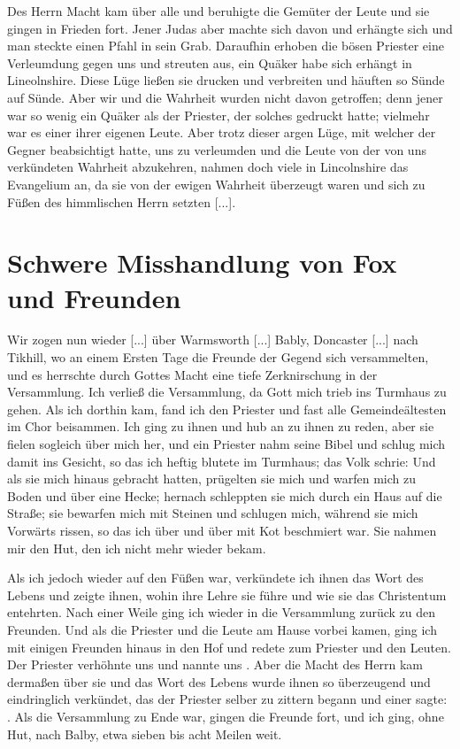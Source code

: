 Des Herrn Macht kam über alle und beruhigte die Gemüter der
Leute und sie gingen in Frieden fort. Jener Judas aber machte
sich davon und erhängte sich und man steckte einen Pfahl in sein
Grab. Daraufhin erhoben die bösen 
Priester eine Verleumdung
gegen uns und streuten aus, ein Quäker habe sich erhängt in
Lineolnshire. Diese Lüge ließen sie drucken und verbreiten und
häuften so Sünde auf Sünde. Aber wir und die Wahrheit wurden
nicht davon getroffen; denn jener war so wenig ein Quäker als
der Priester, der solches gedruckt hatte; vielmehr war es einer
ihrer eigenen Leute. Aber trotz dieser argen Lüge, mit welcher der
Gegner beabsichtigt hatte, uns zu verleumden und die Leute von
der von uns verkündeten Wahrheit abzukehren, nahmen doch viele
in Lincolnshire das Evangelium an, da sie von der ewigen 
Wahrheit überzeugt waren und sich zu Füßen des himmlischen Herrn
setzten [...].

\section{Schwere Misshandlung von Fox und Freunden}

Wir zogen nun wieder [...] über Warmsworth [...] Bably,
Doncaster [...] nach Tikhill, wo an einem Ersten Tage die
Freunde der Gegend sich versammelten, und es herrschte durch
Gottes Macht eine tiefe Zerknirschung in der Versammlung.
Ich verließ die Versammlung, da Gott mich trieb ins Turmhaus
zu gehen. Als ich dorthin kam, fand ich den Priester und fast
alle Gemeindeältesten im Chor beisammen. Ich ging zu ihnen
und hub an zu ihnen zu reden, aber sie fielen sogleich über mich
her, und ein Priester nahm seine Bibel und schlug mich damit
ins Gesicht, so das ich heftig blutete im Turmhaus; das Volk
schrie:  Und als sie mich hinaus
gebracht hatten, prügelten sie mich und warfen mich zu Boden
und über eine Hecke; hernach schleppten sie mich durch ein Haus
auf die Straße; sie bewarfen mich mit Steinen und schlugen mich,
während sie mich Vorwärts rissen, so das ich über und über mit
Kot beschmiert war. Sie nahmen mir den Hut, den ich nicht
mehr wieder bekam. 

Als ich jedoch wieder auf den Füßen war,
verkündete ich ihnen das Wort des Lebens und zeigte ihnen, 
wohin ihre Lehre sie führe und wie sie das Christentum entehrten. Nach
einer Weile ging ich wieder in die Versammlung zurück zu den
Freunden. Und als die Priester und die Leute am Hause vorbei
kamen, ging ich mit einigen Freunden hinaus in den Hof und
redete zum Priester und den Leuten. Der Priester verhöhnte
uns und nannte uns . Aber die Macht des Herrn
kam dermaßen über sie und das Wort des Lebens wurde ihnen
so überzeugend und eindringlich verkündet, das der Priester selber
zu zittern begann und einer 
sagte: . Als die Versammlung zu
Ende war, gingen die Freunde fort, und ich ging, ohne Hut,
nach Balby, etwa sieben bis acht Meilen weit. 

